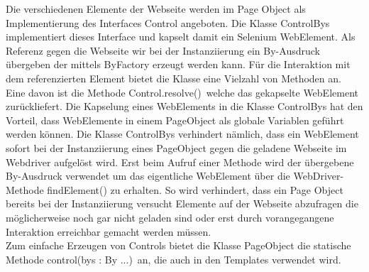 Die verschiedenen Elemente der Webseite werden im Page Object als Implementierung des Interfaces Control angeboten.
Die Klasse ControlBys implementiert dieses Interface und kapselt damit ein Selenium WebElement. Als Referenz gegen die Webseite wir bei der Instanziierung ein By-Ausdruck übergeben der mittels ByFactory erzeugt werden kann.
Für die Interaktion mit dem referenzierten Element bietet die Klasse eine Vielzahl von Methoden an. Eine davon ist die Methode \grq Control.resolve()\grq\
welche das gekapselte WebElement zurückliefert.
Die Kapselung eines WebElements in die Klasse ControlBys hat den Vorteil, dass WebElemente in einem PageObject als globale Variablen geführt werden können.
Die Klasse ControlBys verhindert nämlich, dass ein WebElement sofort bei der Instanziierung eines PageObject gegen die geladene Webseite im Webdriver aufgelöst wird. Erst beim Aufruf einer Methode wird der übergebene By-Ausdruck verwendet um das eigentliche WebElement über die WebDriver-Methode findElement() zu erhalten.
So wird verhindert, dass ein Page Object bereits bei der Instanziierung versucht Elemente auf der Webseite abzufragen die möglicherweise noch gar nicht geladen sind oder erst durch vorangegangene Interaktion erreichbar gemacht werden müssen.\\ Zum einfache Erzeugen von Controls bietet die Klasse PageObject die statische Methode \grq control(bys : By ...)\grq\ an, die auch in den Templates verwendet wird.


